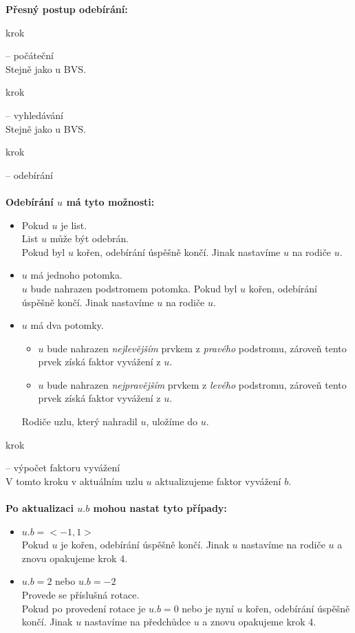 \documentclass[
  biblatex=false,
  font=serif,
  glossaries=false,
  tables=false,
  theorems=false,
  index
]{kidiplom}
\begin{document}
\newpage
\noindent \textbf{Přesný postup odebírání:}
\begin{enumerate} {\bfseries
\item  krok} -- počáteční \\
Stejně jako u BVS.
{\bfseries\item  krok} -- vyhledávání \\
Stejně jako u BVS.
{\bfseries\item  krok} -- odebírání \\\\
\textbf{Odebírání $u$ má tyto možnosti:}
\begin{itemize}
\item Pokud $u$ je list. \\
List $u$ může být odebrán. \\
Pokud byl $u$ kořen, odebírání úspěšně končí. Jinak nastavíme $u$ na rodiče $u$.
\item $u$ má jednoho potomka. \\
$u$ bude nahrazen podstromem potomka.
Pokud byl $u$ kořen, odebírání úspěšně končí. Jinak nastavíme $u$ na rodiče $u$.
\item $u$ má dva potomky. 
\begin{itemize}
\item $u$ bude nahrazen \textit{nejlevějším} prvkem z \textit{pravého} podstromu, zároveň tento prvek získá faktor vyvážení z $u$.
\item $u$ bude nahrazen \textit{nejpravějším} prvkem z \textit{levého} podstromu, zároveň tento prvek získá faktor vyvážení z $u$.
\end{itemize}
Rodiče uzlu, který nahradil $u$, uložíme do $u$.
\end{itemize}
{\bfseries\item  krok} -- výpočet faktoru vyvážení \\
V tomto kroku v aktuálním uzlu $u$ aktualizujeme faktor vyvážení $b$.\\\\
\textbf{Po aktualizaci $u.b$ mohou nastat tyto případy:}
\begin{itemize}
\item $u.b = <-1,1>$\\
Pokud $u$ je kořen, odebírání úspěšně končí. Jinak $u$ nastavíme na rodiče $u$ a znovu opakujeme krok 4.
\item $u.b = 2$ nebo $u.b = -2$\\
Provede se příslušná rotace.\\
Pokud po provedení rotace je $u.b = 0$ nebo je nyní $u$ kořen, odebírání úspěšně končí. Jinak $u$ nastavíme na předchůdce $u$ a znovu opakujeme krok 4.
\end{itemize}
\end{enumerate}
\end{document}
